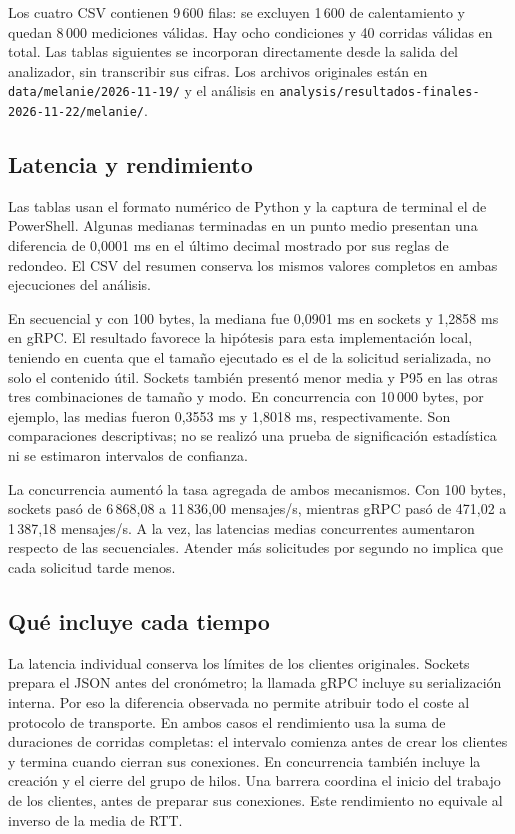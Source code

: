 Los cuatro CSV contienen 9\,600 filas: se excluyen 1\,600 de
calentamiento y quedan 8\,000 mediciones válidas. Hay ocho condiciones
y 40 corridas válidas en total. Las tablas siguientes se incorporan
directamente desde la salida del analizador, sin transcribir sus cifras.
Los archivos originales están en \texttt{data/melanie/2026-11-19/}
y el análisis en \texttt{analysis/resultados-finales-2026-11-22/melanie/}.

\subsection{Latencia y rendimiento}



Las tablas usan el formato numérico de Python y la captura de terminal
el de PowerShell. Algunas medianas terminadas en un punto medio
presentan una diferencia de 0,0001 ms en el último decimal mostrado
por sus reglas de redondeo. El CSV del resumen conserva los mismos
valores completos en ambas ejecuciones del análisis.

En secuencial y con 100 bytes, la mediana fue 0,0901 ms en sockets y
1,2858 ms en gRPC. El resultado favorece la hipótesis para esta
implementación local, teniendo en cuenta que el tamaño ejecutado es
el de la solicitud serializada, no solo el contenido útil.
Sockets también presentó menor media y P95 en las otras tres
combinaciones de tamaño y modo. En concurrencia con 10\,000 bytes,
por ejemplo, las medias fueron 0,3553 ms y 1,8018 ms, respectivamente.
Son comparaciones descriptivas; no se realizó una prueba de
significación estadística ni se estimaron intervalos de confianza.

La concurrencia aumentó la tasa agregada de ambos mecanismos.
Con 100 bytes, sockets pasó de 6\,868,08 a 11\,836,00 mensajes/s,
mientras gRPC pasó de 471,02 a 1\,387,18 mensajes/s. A la vez,
las latencias medias concurrentes aumentaron respecto de las
secuenciales. Atender más solicitudes por segundo no implica que
cada solicitud tarde menos.

\subsection{Qué incluye cada tiempo}
La latencia individual conserva los límites de los clientes originales.
Sockets prepara el JSON antes del cronómetro; la llamada gRPC incluye
su serialización interna. Por eso la diferencia observada no permite
atribuir todo el coste al protocolo de transporte.
En ambos casos el rendimiento usa la suma de duraciones de corridas
completas: el intervalo comienza antes de crear los clientes y termina
cuando cierran sus conexiones. En concurrencia también incluye la
creación y el cierre del grupo de hilos. Una barrera coordina el inicio
del trabajo de los clientes, antes de preparar sus conexiones.
Este rendimiento no equivale al inverso de la media de RTT.

